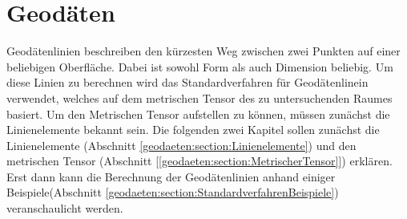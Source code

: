 %
%
%
%
\chapter{Geodäten\label{chapter:geodaeten}}
\begin{refsection}

Geodätenlinien beschreiben den kürzesten Weg zwischen zwei Punkten auf einer beliebigen Oberfläche.
Dabei ist sowohl Form als auch Dimension beliebig.
Um diese Linien zu berechnen wird das Standardverfahren für Geodätenlinein verwendet, welches auf dem metrischen Tensor des zu untersuchenden Raumes basiert.
Um den Metrischen Tensor aufstellen zu können, müssen zunächst die Linienelemente bekannt sein.
Die folgenden zwei Kapitel sollen zunächst die Linienelemente (Abschnitt \ref{geodaeten:section:Linienelemente}) und den metrischen Tensor (Abschnitt [\ref{geodaeten:section:MetrischerTensor}]) erklären.
Erst dann kann die Berechnung der Geodätenlinien anhand einiger Beispiele(Abschnitt \ref{geodaeten:section:StandardverfahrenBeispiele}) veranschaulicht werden.





\printbibliography[heading=subbibliography]
\end{refsection}
